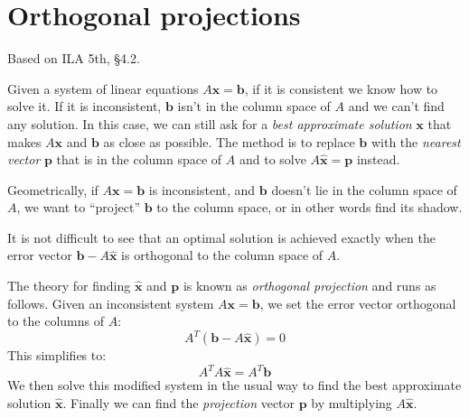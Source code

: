 \documentclass[11pt,oneside]{amsbook}
\theoremstyle{definition}
\theoremstyle{plain}
\theoremstyle{definition}
\theoremstyle{remark}
\numberwithin{equation}{section}
\numberwithin{figure}{section}
\begin{document}
\newpage
\section{Orthogonal projections}

Based on ILA 5th, \S 4.2.

Given a system of linear equations $A\mathbf{x}=\mathbf{b}$, if it is consistent we know how to solve it. If it is inconsistent, $\mathbf{b}$ isn't in the column space of $A$ and we can't find any solution. In this case, we can still ask for a \emph{best approximate solution} $\mathbf{x}$ that makes $A\mathbf{x}$ and $\mathbf{b}$ as close as possible. The method is to replace $\mathbf{b}$ with the \emph{nearest vector} $\mathbf{p}$ that is in the column space of $A$ and to solve $A\hat{\mathbf{x}}=\mathbf{p}$ instead.

Geometrically, if $A\mathbf{x}=\mathbf{b}$ is inconsistent, and $\mathbf{b}$ doesn't lie in the column space of $A$, we want to ``project'' $\mathbf{b}$ to the column space, or in other words find its shadow.

\begin{figure}[h]
  [Picture]
\end{figure}

It is not difficult to see that an optimal solution is achieved exactly when the error vector $\mathbf{b}-A\hat{\mathbf{x}}$ is orthogonal to the column space of $A$.

The theory for finding $\hat{\mathbf{x}}$ and $\mathbf{p}$ is known as \emph{orthogonal projection} and runs as follows. Given an inconsistent system $A\mathbf{x}=\mathbf{b}$, we set the error vector orthogonal to the columns of $A$:
\[A^T(\mathbf{b}-A\hat{\mathbf{x}})=0
\]
This simplifies to:
\[A^TA\hat{\mathbf{x}}=A^T\mathbf{b}
\]
We then solve this modified system in the usual way to find the best approximate solution $\hat{\mathbf{x}}$. Finally we can find the \emph{projection} vector $\mathbf{p}$ by multiplying $A\hat{\mathbf{x}}$.
\end{document}
